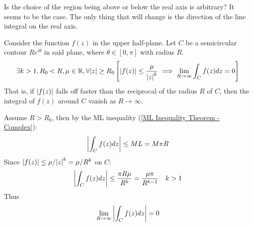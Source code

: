 \documentclass[12pt, english]{book}
\makeatletter
\renewenvironment{proof}[1][\proofname]{\par
	\pushQED{\qed}%
	\normalfont \topsep6\p@\@plus6\p@\relax
	\list{}{%
		\settowidth{\leftmargin}{\itshape\proofname:\hskip\labelsep}%
		\setlength{\labelwidth}{0pt}%
		\setlength{\itemindent}{-\leftmargin}%
	}%
	\item[\hskip\labelsep\itshape#1\@addpunct{:}]\ignorespaces
	}{ \popQED\endlist\@endpefalse}
\makeatother
\begin{document}
	\begin{question}
		Is the choice of the region being above or below the real axis is arbitrary? It seems to be the case. The only thing that will change is the direction of the line integral on the real axis.
	\end{question}

	\begin{theorem}
		Consider the function \(f(z)\) in the upper half-plane. Let \(C\) be a semicircular contour \(Re^{i\theta}\) in said plane, where \(\theta \in [0, \pi]\) with radius \(R\). 
		\begin{align*}
			\exists k>1, R_0<R, \mu \in \mathbb{R}, \forall \abs{z} \geq R_0 
			\left[\abs{f(z)} \leq \frac{\mu}{\abs{z}^k} 
			\implies \lim_{R\rightarrow \infty} \int_{C} f(z) dz = 0\right]
		\end{align*}
		That is, if \(\abs{f(z)}\) falls off faster than the reciprocal of the radius \(R\) of \(C\), then the integral of \(f(z)\) around \(C\) vanish as \(R \rightarrow \infty\).
	\end{theorem}
	\begin{proof}
		Assume \(R > R_0\), then by the ML inequality (\cref{ML Inequality Theorem - Complex}):
		\begin{align*}
			\abs{\int_{C} f(z) dz} \leq ML = M\pi R
		\end{align*}
		Since \(\abs{f(z)} \leq \mu / \abs{z}^k = \mu/ R^k\) on \(C\):
		\begin{align*}
			\abs{\int_{C} f(z) dz} &\leq \frac{\pi R \mu}{R^k} = \frac{\mu \pi}{R^{k-1}} & k>1
		\end{align*}
		Thus 
		\begin{align*}
			\lim_{R\rightarrow \infty} \abs{\int_{C} f(z) dz} = 0
		\end{align*}
	\end{proof}
\end{document}
